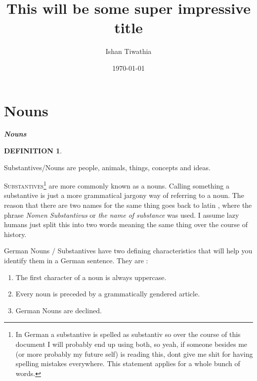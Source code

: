 \documentclass[a4paper,twocolumn,10pt]{article}
\title{This will be some super impressive title}
\author{Ishan Tiwathia}
\date{\today}
\newtheorem{mydef}{DEFINITION}[section]
\newcommand{\newpar}
{\par \vspace{0.3cm}}
\newcommand{\tcolorboxstart}
{
	\nolinenumbers
	\vspace{0.2cm}
	\centering
}
\newcommand{\tcolorboxend}
{
	\justifying
	\vspace{0.2cm}
	\linenumbers
}
\newcommand{\tcolorboxdefinition}[3]
{

\tcolorboxstart
\begin{defn-bg}

	\begin{defn-title}[width=7cm]{}
	{
		\normalsize \textbf{\textit{#1}}
	}
	\end{defn-title}

	\begin{defn-theword}
	{
		\footnotesize
		\begin{mydef} #2
		\end{mydef}
	}
	\end{defn-theword}


	\begin{defn-content}

	\justify
	#3

	\end{defn-content}

\end{defn-bg}
\tcolorboxend
}
\begin{document}
\raggedbottom
\onecolumn

\tableofcontents
\pagebreak

\listoftables
\clearpage
\twocolumn
\justifying


\linenumbers


\section{{Nouns}}
\label{sec:nouns}



\tcolorboxdefinition
{Nouns}
{\label{def:nouns}}
{


		Substantives/Nouns are people, animals, things, concepts and ideas.

}


\lettrine[lines=3, findent=3pt, nindent=0pt]{S}{ubstantives}\footnote{In German
	a substantive is spelled as substantiv so over the course of this document I
	will probably end up using both, so yeah, if someone besides me (or more
	probably my future self) is reading this, dont give me shit for having
	spelling mistakes everywhere. This statement applies for a whole bunch of
	words.} are more commonly known as a nouns. Calling something a substantive
is just a more grammatical jargony way of referring to a noun. The reason that
there are two names for the same thing goes back to latin , where the phrase
\textit{Nomen Substantivus} or \textit{the name of substance} was used. I assume
lazy humans just split this into two words meaning the same thing over the
course of history.\newpar

German Nouns / Substantives have two defining characteristics that will help you
identify them in a German sentence. They are :

\begin{enumerate}[noitemsep]
	\item The first character of a noun is always uppercase.
	\item Every noun is preceded by a grammatically gendered article.
	\item German Nouns are declined.
\end{enumerate}
\end{document}
